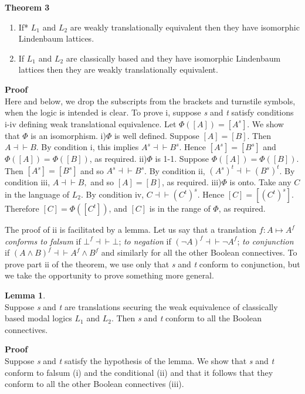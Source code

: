 \documentclass[
  10pt,
  letterpaper,
  DIV=11,
  numbers=noendperiod,
  twoside]{scrartcl}
\providecommand{\tightlist}{%
  \setlength{\itemsep}{0pt}\setlength{\parskip}{0pt}}\usepackage{longtable,booktabs,array}
\begin{document}
\textbf{Theorem 3}

\begin{enumerate}
\def\labelenumi{\roman{enumi}.}
\tightlist
\item
  If* \(L_1\) and \(L_2\) are weakly translationally equivalent then
  they have isomorphic Lindenbaum lattices.
\item
  If \(L_1\) and \(L_2\) are classically based and they have isomorphic
  Lindenbaum lattices then they are weakly translationally equivalent.
\end{enumerate}

\textbf{Proof}\\
Here and below, we drop the subscripts from the brackets and turnstile
symbols, when the logic is intended is clear. To prove i, suppose
\emph{s} and \emph{t} satisfy conditions i-iv defining weak
translational equivalence. Let \(\Phi([A])=[A^s]\). We show that
\(\Phi\) is an isomorphism. i)\(\Phi\) is well defined. Suppose
\([A]=[B]\). Then \(A{\dashv}{\vdash}B\). By condition i, this implies
\(A^s{\dashv}{\vdash}B^s\). Hence \([A^s] = [B^s]\) and
\(\Phi([A])=\Phi([B])\), as required. ii)\(\Phi\) is 1-1. Suppose
\(\Phi([A])=\Phi([B])\). Then \([A^s]=[B^s]\) and so
\(A^s{\dashv}{\vdash}B^s\). By condition ii,
\((A^s)^t{\dashv}{\vdash}(B^s)^t\). By condition iii,
\(A{\dashv}{\vdash}B,\) and so \([A]=[B]\), as required. iii)\(\Phi\) is
onto. Take any \(C\) in the language of \(L_2\). By condition iv,
\(C{\dashv}{\vdash}(C^t)^s\). Hence \([C] = [(C^t)^s]\). Therefore
\([C]=\Phi([C^t])\), and \([C]\) is in the range of \(\Phi\), as
required.

The proof of ii is facilitated by a lemma. Let us say that a translation
\(f\colon A{\mapsto}A^f\) \emph{conforms to falsum} if
\(\bot^f {\dashv}{\vdash} \bot\); \emph{to negation} if
\((\neg A)^f {\dashv}{\vdash} \neg A^f\); \emph{to conjunction} if
\((A\wedge B)^f {\dashv}{\vdash}A^f \wedge B^f\) and similarly for all
the other Boolean connectives. To prove part ii of the theorem, we use
only that \emph{s} and \emph{t} conform to conjunction, but we take the
opportunity to prove something more general.

\textbf{Lemma 1}.\\
Suppose \emph{s} and \emph{t} are translations securing the weak
equivalence of classically based modal logics \(L_1\) and \(L_2\). Then
\emph{s} and \emph{t} conform to all the Boolean connectives.

\textbf{Proof}\\
Suppose \emph{s} and \emph{t} satisfy the hypothesis of the lemma. We
show that \emph{s} and \emph{t} conform to falsum (i) and the
conditional (ii) and that it follows that they conform to all the other
Boolean connectives (iii).
\end{document}
